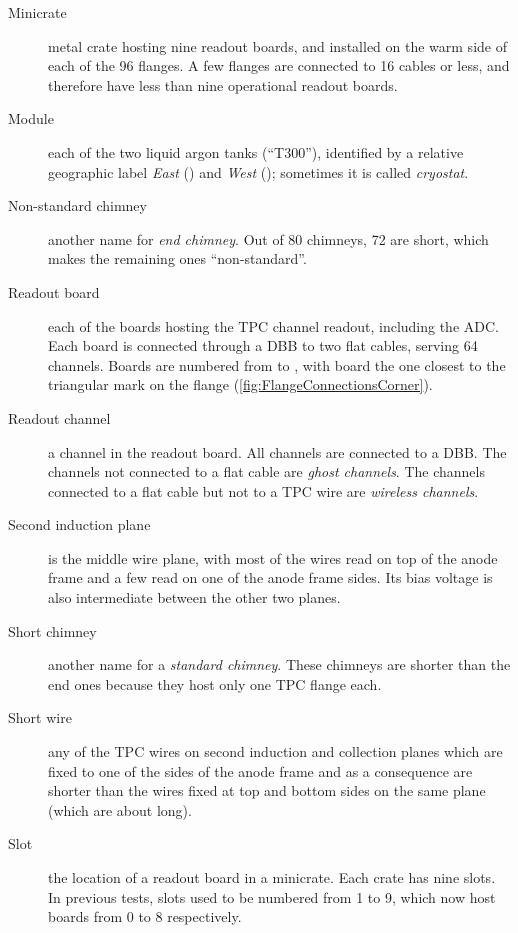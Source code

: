 \begin{description}
  \item[Minicrate]
    metal crate hosting nine readout boards,
    and installed on the warm side of each of the 96 flanges.
    A few flanges are connected to 16 cables or less, and therefore have
    less than nine operational readout boards.

  \item[Module]
    each of the two liquid argon tanks (``T300''), identified by
    a relative geographic label \emph{East} () and \emph{West}
    (); sometimes it is called \emph{cryostat}.

  \item[Non-standard chimney]
    another name for \emph{end chimney}.
    Out of 80 chimneys, 72 are short, which makes the remaining ones ``non-standard''.

  \item[Readout board]
    each of the boards hosting the TPC channel readout, including the ADC.
    Each board is connected through a DBB to two flat cables, serving 64 channels.
    Boards are numbered from  to , with board 
    the one closest to the triangular mark on the flange
    (\cref{fig:FlangeConnectionsCorner}).

  \item[Readout channel]
    a channel in the readout board. All channels are connected to a DBB.
    The channels not connected to a flat cable are \emph{ghost channels}.
    The channels connected to a flat cable but not to a TPC wire are
    \emph{wireless channels}.
  
  \item[Second induction plane]
    is the middle wire plane,
    with most of the wires read on top of the anode frame and a few read on one
    of the anode frame sides.
    Its bias voltage is also intermediate between the other two planes.

  \item[Short chimney]
    another name for a \emph{standard chimney}. These chimneys are shorter
    than the end ones because they host only one TPC flange each.

  \item[Short wire]
    any of the TPC wires on second induction and collection planes which are
    fixed to one of the sides of the anode frame and as a consequence are
    shorter than the wires fixed at top and bottom sides on the same plane
    (which are about  long).

  \item[Slot]
    the location of a readout board in a minicrate. Each crate has nine slots.
    In previous tests, slots used to be numbered from 1 to 9, which now host
    boards from 0 to 8 respectively.


\end{description}
